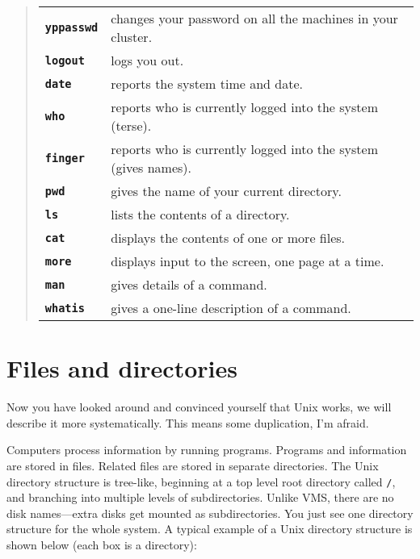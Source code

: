 \begin{quote}
\begin{tabular}{lp{5.2in}}

{\tt\bf yppasswd}  & changes your password on all the machines in your cluster. \\

{\tt\bf logout}  & logs you out. \\

{\tt\bf date} & reports the system time and date. \\

{\tt\bf who}  & reports who is currently logged into the system (terse). \\

{\tt\bf finger}  & reports who is currently logged into the system (gives names).
 \\

{\tt\bf pwd}  & gives the name of your current directory. \\

{\tt\bf ls}   & lists the contents of a directory.  \\

{\tt\bf cat}  & displays the contents of one or more files. \\

{\tt\bf more} &  displays input to the screen, one page at a time. \\

{\tt\bf man}  & gives details of a command. \\

{\tt\bf whatis}  & gives a one-line description of a command.
\end{tabular}
\end{quote}

\section{Files and directories}

Now you have looked around and convinced yourself that Unix works, we will
describe it more systematically.
This means some duplication, I'm afraid.

Computers process information by running programs.
Programs and information are stored in files.
Related files are stored in separate directories.
The Unix directory structure is tree-like, beginning at a top level
root directory called {\tt /}, and branching into multiple levels of
subdirectories.
Unlike VMS, there are no disk names---extra disks get mounted as subdirectories.
You just see one directory structure for the whole system.
A typical example of a Unix directory structure is shown below (each box is a
directory):

